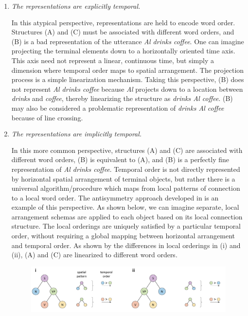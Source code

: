 \begin{enumerate}
\item \textit{The representations are explicitly temporal.}

  In this atypical perspective, representations are held to encode word order. Structures (A) and (C) must be associated with different word orders, and (B) is a bad representation of the utterance \textit{Al drinks coffee}. One can imagine projecting the terminal elements down to a horizontally oriented time axis. This axis need not represent a linear, continuous time, but simply a dimension where temporal order maps to spatial arrangement. The projection process is a simple linearization mechanism. Taking this perspective, (B) does not represent \textit{Al drinks coffee} because \textit{Al} projects down to a location between \textit{drinks} and \textit{coffee}, thereby linearizing the structure as \textit{drinks Al coffee}. (B) may also be considered a problematic representation of \textit{drinks Al coffee} because of line crossing.

\item \textit{The representations are implicitly temporal.}

  In this more common perspective, structures (A) and (C) are associated with different word orders, (B) is equivalent to (A), and (B) is a perfectly fine representation of \textit{Al drinks coffee}. Temporal order is not directly represented by horizontal spatial arrangement of terminal objects, but rather there is a universal algorithm/procedure which maps from local patterns of connection to a local word order. The antisymmetry approach developed in \citet{Kayne1994} is an example of this perspective. As shown below, we can imagine separate, local arrangement schemas are applied to each object based on its local connection structure. The local orderings are uniquely satisfied by a particular temporal order, without requiring a global mapping between horizontal arrangement and temporal order. As shown by the differences in local orderings in (i) and (ii), (A) and (C) are linearized to different word orders.

  
\begin{figure}
\includegraphics[width=\textwidth]{figures/Tilsen-img41.png}
\caption{\missingcaption}
\label{fig:}
\end{figure}
 


\end{enumerate}
